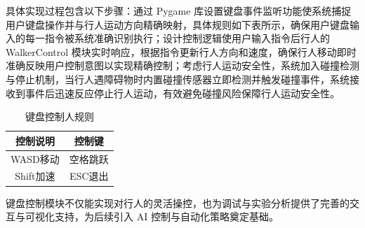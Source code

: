 具体实现过程包含以下步骤：通过 Pygame 库设置键盘事件监听功能使系统捕捉用户键盘操作并与行人运动方向精确映射，具体规则如下表所示，确保用户键盘输入的每一指令被系统准确识别执行；设计控制逻辑使用户输入指令后行人的 WalkerControl 模块实时响应，根据指令更新行人方向和速度，确保行人移动即时准确反映用户控制意图以实现精确控制；考虑行人运动安全性，系统加入碰撞检测与停止机制，当行人遇障碍物时内置碰撞传感器立即检测并触发碰撞事件，系统接收到事件后迅速反应停止行人运动，有效避免碰撞风险保障行人运动安全性。

\begin{table}[H]
    \centering
    \begin{tabular}{|c|c|}
    \hline
    控制说明 & 控制键 \\
    \hline
    WASD移动 & 空格跳跃 \\
    \hline
    Shift加速 & ESC退出 \\
    \hline
    \end{tabular}
    \caption{键盘控制人规则}
\end{table}

键盘控制模块不仅能实现对行人的灵活操控，也为调试与实验分析提供了完善的交互与可视化支持，为后续引入 AI 控制与自动化策略奠定基础。
